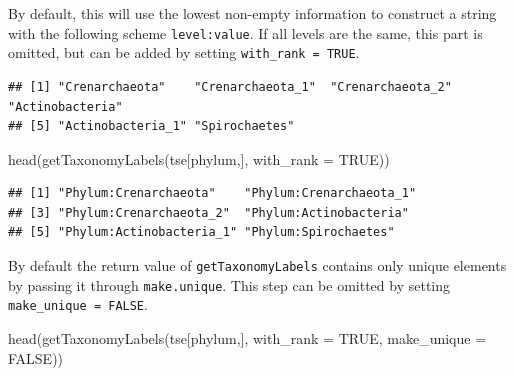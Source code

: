\documentclass[
]{book}
\newenvironment{Shaded}{\begin{snugshade}}{\end{snugshade}}
\newcommand{\AttributeTok}[1]{\textcolor[rgb]{0.77,0.63,0.00}{#1}}
\newcommand{\ConstantTok}[1]{\textcolor[rgb]{0.00,0.00,0.00}{#1}}
\newcommand{\DecValTok}[1]{\textcolor[rgb]{0.00,0.00,0.81}{#1}}
\newcommand{\FunctionTok}[1]{\textcolor[rgb]{0.00,0.00,0.00}{#1}}
\newcommand{\NormalTok}[1]{#1}
\newcommand{\OtherTok}[1]{\textcolor[rgb]{0.56,0.35,0.01}{#1}}
\newcommand{\SpecialCharTok}[1]{\textcolor[rgb]{0.00,0.00,0.00}{#1}}
\begin{document}
By default, this will use the lowest non-empty information to construct a
string with the following scheme \texttt{level:value}. If all levels are the same,
this part is omitted, but can be added by setting \texttt{with\_rank\ =\ TRUE}.

\begin{Shaded}
\end{Shaded}

\begin{verbatim}
## [1] "Crenarchaeota"    "Crenarchaeota_1"  "Crenarchaeota_2"  "Actinobacteria"  
## [5] "Actinobacteria_1" "Spirochaetes"
\end{verbatim}

\begin{Shaded}
\begin{Highlighting}[]
\FunctionTok{head}\NormalTok{(}\FunctionTok{getTaxonomyLabels}\NormalTok{(tse[phylum,], }\AttributeTok{with\_rank =} \ConstantTok{TRUE}\NormalTok{))}
\end{Highlighting}
\end{Shaded}

\begin{verbatim}
## [1] "Phylum:Crenarchaeota"    "Phylum:Crenarchaeota_1" 
## [3] "Phylum:Crenarchaeota_2"  "Phylum:Actinobacteria"  
## [5] "Phylum:Actinobacteria_1" "Phylum:Spirochaetes"
\end{verbatim}

By default the return value of \texttt{getTaxonomyLabels} contains only
unique elements by passing it through \texttt{make.unique}. This step can be
omitted by setting \texttt{make\_unique\ =\ FALSE}.

\begin{Shaded}
\begin{Highlighting}[]
\FunctionTok{head}\NormalTok{(}\FunctionTok{getTaxonomyLabels}\NormalTok{(tse[phylum,], }\AttributeTok{with\_rank =} \ConstantTok{TRUE}\NormalTok{, }\AttributeTok{make\_unique =} \ConstantTok{FALSE}\NormalTok{))}
\end{Highlighting}
\end{Shaded}
\end{document}
